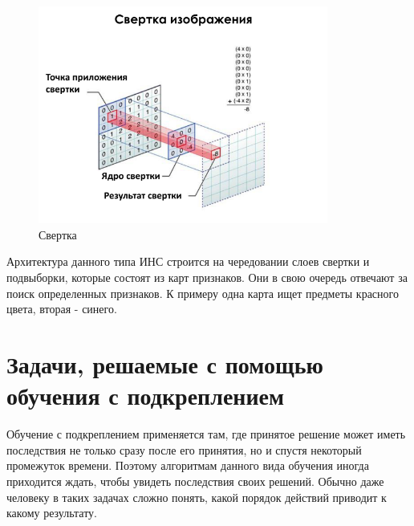 \documentclass[bachelor, och, coursework]{shiza}
\begin{document}
\begin{figure}[H]
    \centering
    \includegraphics[width=0.85\textwidth]{pic/6}
    \caption{Свертка}
    \label{fig:img1}
\end{figure}

Архитектура данного типа ИНС строится на чередовании слоев свертки и подвыборки, которые состоят из карт признаков. Они в свою очередь отвечают за поиск определенных
признаков. К примеру одна карта ищет предметы красного цвета, вторая - синего.

\section{Задачи, решаемые с помощью обучения с подкреплением}
Обучение с подкреплением применяется там, где принятое решение может иметь последствия не только сразу после его принятия,
но и спустя некоторый промежуток времени. Поэтому алгоритмам данного вида обучения иногда приходится ждать, чтобы
увидеть последствия своих решений. Обычно даже человеку в таких задачах сложно понять, какой порядок действий приводит к
какому результату.
\end{document}
